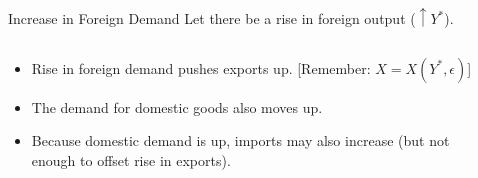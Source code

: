\documentclass[shownotes,11pt, aspectratio=169]{beamer}
\begin{document}
\begin{frame}{Increase in Foreign Demand}
Let there be a rise in foreign output ($\uparrow Y^{\ast}$).
\begin{columns}[T] %
\begin{column}{.36\textwidth}
\begin{itemize}
\item Rise in foreign demand pushes exports up. [Remember: $X = X(Y^{\ast}, \epsilon)$]
\item The demand for domestic goods also moves up.
\item Because domestic demand is up, imports may also increase (but not enough to offset rise in exports).
\end{itemize}
\end{column}
\hfill
\pause
\begin{column}{.54\textwidth}
\end{column}
\end{columns}
\end{frame}
\end{document}
